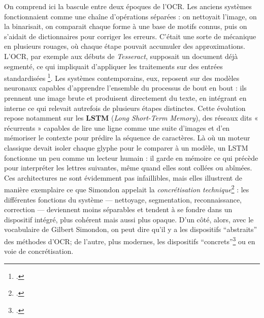 On comprend ici la bascule entre deux époques de l’OCR. Les anciens systèmes fonctionnaient comme une chaîne d’opérations séparées : on nettoyait l’image, on la binarisait, on comparait chaque forme à une base de motifs connus, puis on s’aidait de dictionnaires pour corriger les erreurs. C’était une sorte de mécanique en plusieurs rouages, où chaque étape pouvait accumuler des approximations. L’OCR, par exemple aux débuts de \emph{Tesseract}, supposait un document déjà segmenté, ce qui impliquait d’appliquer les traitements sur des entrées standardisées \footcite[][]{smith}. Les systèmes contemporains, eux, reposent sur des modèles neuronaux capables d’apprendre l’ensemble du processus de bout en bout : ils prennent une image brute et produisent directement du texte, en intégrant en interne ce qui relevait autrefois de plusieurs étapes distinctes. Cette évolution repose notamment sur les \textbf{LSTM} (\emph{Long Short-Term Memory}), des réseaux dits « récurrents » capables de lire une ligne comme une suite d’images et d’en mémoriser le contexte pour prédire la séquence de caractères. Là où un moteur classique devait isoler chaque glyphe pour le comparer à un modèle, un LSTM fonctionne un peu comme un lecteur humain : il garde en mémoire ce qui précède pour interpréter les lettres suivantes, même quand elles sont collées ou abîmées. Ces architectures ne sont évidemment pas infaillibles, mais elles illustrent de manière exemplaire ce que Simondon appelait la \emph{concrétisation technique}\footcite[][]{meot} : les différentes fonctions du système — nettoyage, segmentation, reconnaissance, correction — deviennent moins séparables et tendent à se fondre dans un dispositif intégré, plus cohérent mais aussi plus opaque. D'un côté, alors, avec le vocabulaire de Gilbert Simondon, on peut dire qu'il y a les dispositifs \enquote{abstraits} des méthodes d'OCR; de l'autre, plus modernes, les dispositifs \enquote{concrets}\footcite[][]{bontems} ou en voie de concrétisation.

